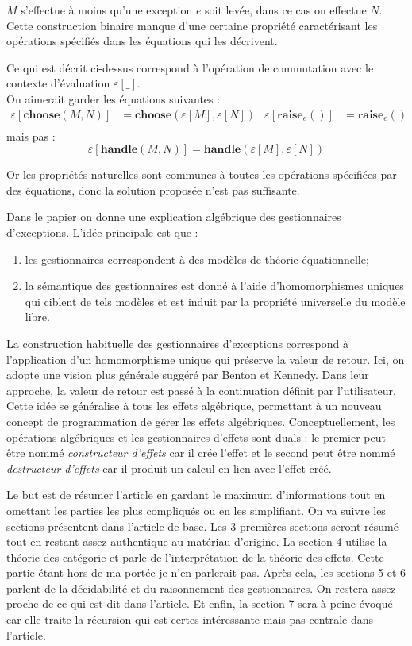 	$M$ s'effectue à moins qu'une exception $e$ soit levée, dans ce cas on effectue $N$. Cette construction binaire manque d'une certaine propriété caractérisant les opérations spécifiés dans les équations qui les décrivent.
	
	\begin{exemple}
		Ce qui est décrit ci-dessus correspond à l'opération de commutation avec le contexte d'évaluation $\varepsilon[\_]$.\\
		On aimerait garder les équations suivantes : 
		\begin{align*}
			\varepsilon[\textbf{choose}(M,N)] &= \textbf{choose}(\varepsilon[M],\varepsilon[N]) & \varepsilon[\textbf{raise}_e()] &= \textbf{raise}_e()\\
		\end{align*}
		mais pas : 
		\[\varepsilon[\textbf{handle}(M,N)] = \textbf{handle}(\varepsilon[M],\varepsilon[N])\]
	
		Or les propriétés naturelles sont communes à toutes les opérations spécifiées par des équations, donc la solution proposée n'est pas suffisante.
	\end{exemple} 

	Dans le papier on donne une explication algébrique des gestionnaires d'exceptions. L'idée principale est que :
	\begin{enumerate}
		\item les gestionnaires correspondent à des modèles de théorie équationnelle;
		\item la sémantique des gestionnaires est donné à l'aide d'homomorphismes uniques qui ciblent de tels modèles et est induit par la propriété universelle du modèle libre. 
	\end{enumerate}

	La construction habituelle des gestionnaires d'exceptions correspond à l'application d'un homomorphisme unique qui préserve la valeur de retour. Ici, on adopte une vision plus générale suggéré par Benton et Kennedy. Dans leur approche, la valeur de retour est passé à la continuation définit par l'utilisateur. Cette idée se généralise à tous les effets algébrique, permettant à un nouveau concept de programmation de gérer les effets algébriques. Conceptuellement, les opérations algébriques et les gestionnaires d'effets sont duals : le premier peut être nommé \textit{constructeur d'effets} car il crée l'effet et le second peut être nommé \textit{destructeur d'effets} car il produit un calcul en lien avec l'effet créé.
	\smallbreak
	
	Le but est de résumer l'article en gardant le maximum d'informations tout en omettant les parties les plus compliqués ou en les simplifiant. On va suivre les sections présentent dans l'article de base. Les 3 premières sections seront résumé tout en restant assez authentique au matériau d'origine. La section 4 utilise la théorie des catégorie et parle de l'interprétation de la théorie des effets. Cette partie étant hors de ma portée je n'en parlerait pas. Après cela, les sections 5 et 6 parlent de la décidabilité et du raisonnement des gestionnaires. On restera assez proche de ce qui est dit dans l'article. Et enfin, la section 7 sera à peine évoqué car elle traite la récursion qui est certes intéressante mais pas centrale dans l'article. 